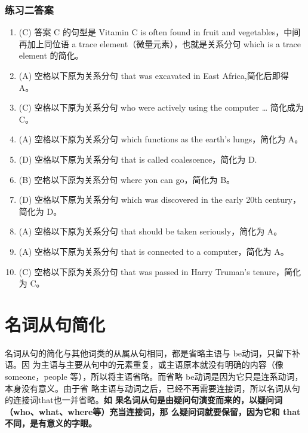 \subsection{练习二答案}
\begin{enumerate}
\item (C) 答案 C 的句型是 Vitamin C is often found in fruit and vegetables，中间
  再加上同位语 a trace element（微量元素），也就是关系分句 which is a trace
  element 的简化。

\item (A) 空格以下原为关系分句 that was excavated in East Africa,简化后即得 A。

\item (C) 空格以下原为关系分句 who were actively using the computer \ldots{} 简化成为 C。

\item (A) 空格以下原为关系分句 which functions as the earth's lungs，简化为 A。

\item (D) 空格以下原为关系分句 that is called coalescence，简化为 D.

\item (B) 空格以下原为关系分句 where yon can go，简化为 B。

\item  (D) 空格以下原为关系分句 which was discovered in the early 20th century，简化为 D。

\item (A) 空格以下原为关系分句 that should be taken seriously，简化为 A。

\item  (A) 空格以下原为关系分句 that is connected to a computer，简化为 A。

\item (C) 空格以下原为关系分句 that was passed in Harry Truman's tenure，简化为 C。

\end{enumerate}



\chapter{名词从句简化}

名词从句的简化与其他词类的从属从句相同，都是省略主语与 be动词，只留下补语。因
为主语与主要从句中的元素重复，或主语原本就没有明确的内容（像someone，people
等），所以将主语省略。而省略 be动词是因为它只是连系动词，本身没有意义。由于省
略主语与动词之后，已经不再需要连接词，所以名词从句的连接词that也一并省略。\textbf{如
果名词从句是由疑问句演变而来的，以疑问词（who、what、where等）充当连接词，那
么疑问词就要保留，因为它和 that 不同，是有意义的字眼。}

